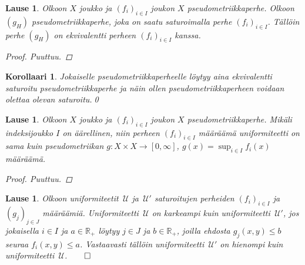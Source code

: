 \documentclass[12pt,a4paper,leqno]{report}
\newcommand{\R}{\mathbb{R}}
\newcommand{\U}{\,\mathcal{U}}
\newcommand{\Pot}{\mathcal{P}}
\theoremstyle{plain}
\newtheorem{lause}[equation]{Lause}
\newtheorem{kor}[equation]{Korollaari}
\theoremstyle{definition}
\theoremstyle{remark}
\begin{document}
\begin{lause}
Olkoon $X$ joukko ja $(f_i)_{i\in I} $ joukon $X$ pseudometriikkaperhe. 
Olkoon $(g_H) $ pseudometriikkaperhe, 
joka on saatu saturoimalla perhe $(f_i)_{i\in I} $. 
Tällöin perhe $(g_H) $ on ekvivalentti 
perheen $(f_i)_{i\in I}$ kanssa.
\begin{proof}
Puuttuu.
\end{proof}
\end{lause}
\begin{kor}\label{saturoitu oletus}
Jokaiselle pseudometriikkaperheelle löytyy aina ekvivalentti saturoitu pseudometriikkaperhe 
ja näin ollen pseudometriikkaperheen voidaan olettaa olevan saturoitu.\qed
\end{kor}
\begin{lause}
%
%
Olkoon $X$ joukko ja $(f_i)_{i\in I} $ joukon $X$ pseudometriikkaperhe. 
Mikäli indeksijoukko $I$ on äärellinen, niin perheen $(f_i)_{i\in I}$ määräämä 
uniformiteetti on sama kuin pseudometriikan $g\colon X\times X\rightarrow [0,\infty]$, $g(x)=\sup_{i\in I} f_i(x)$ määräämä.
\begin{proof}
Puuttuu.
\end{proof}
\end{lause}
\begin{lause}
Olkoon uniformiteetit $\U$ ja $\U'$ saturoitujen perheiden 
$(f_i)_{i\in I}$ ja $(g_j)_{j\in J}$ määräämiä. 
Uniformiteetti $\U$ on karkeampi kuin uniformiteetti $\U'$, 
jos jokaisella $i\in I$ ja $a\in\R_+$ löytyy $j\in J$ ja $b\in\R_+$, 
joilla ehdosta $g_j(x,y)\leq b$ seuraa $f_i(x,y)\leq a$. 
Vastaavasti tällöin uniformiteetti $\U'$ on hienompi kuin uniformiteetti $\U$.$\qed$
\end{lause}
\end{document}
